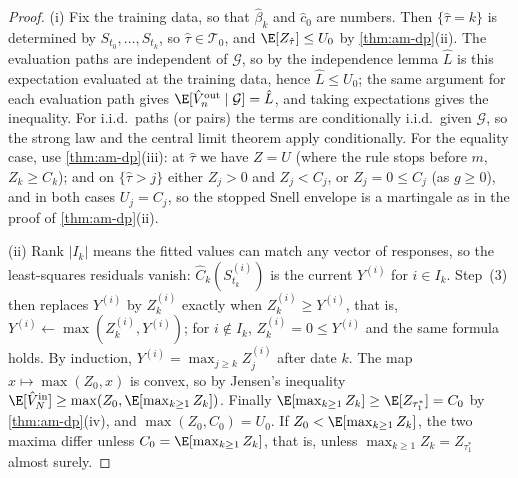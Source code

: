 \begin{proof}
(i) Fix the training data, so that $\hat\beta_k$ and $\hat c_0$ are numbers. Then
$\{\hat\tau=k\}$ is determined by $S_{t_0},\dots,S_{t_k}$, so $\hat\tau\in\mathcal T_0$, and
$\E[Z_{\hat\tau}]\le U_0$ by \cref{thm:am-dp}(ii). The evaluation paths are independent of
$\mathcal G$, so by the independence lemma $\hat L$ is this expectation evaluated at the
training data, hence $\hat L\le U_0$; the same argument for each evaluation path gives
$\E[\hat V^{\rm out}_n\mid\mathcal G]=\hat L$, and taking expectations gives the inequality.
For i.i.d.\ paths (or pairs) the terms are conditionally i.i.d.\ given $\mathcal G$, so the
strong law and the central limit theorem apply conditionally. For the equality case, use \cref{thm:am-dp}(iii): at
$\hat\tau$ we have $Z=U$ (where the rule stops before $m$, $Z_k\ge C_k$); and on
$\{\hat\tau>j\}$ either $Z_j>0$ and $Z_j<C_j$, or $Z_j=0\le C_j$ (as $g\ge0$), and in both
cases $U_j=C_j$, so the stopped Snell envelope is a martingale as in the proof of
\cref{thm:am-dp}(ii).

(ii) Rank $|I_k|$ means the fitted values can match any vector of responses, so the
least-squares residuals vanish: $\hat C_k(S^{(i)}_{t_k})$ is the current $Y^{(i)}$ for
$i\in I_k$. Step~(3) then replaces $Y^{(i)}$ by $Z^{(i)}_k$ exactly when $Z^{(i)}_k\ge Y^{(i)}$,
that is, $Y^{(i)}\leftarrow\max(Z^{(i)}_k,Y^{(i)})$; for $i\notin I_k$, $Z^{(i)}_k=0\le
Y^{(i)}$ and the same formula holds. By induction, $Y^{(i)}=\max_{j\ge k}Z^{(i)}_j$ after
date $k$. The map $x\mapsto\max(Z_0,x)$ is convex, so by Jensen's inequality
$\E[\hat V^{\rm in}_N]\ge\max(Z_0,\E[\max_{k\ge1}Z_k])$. Finally
$\E[\max_{k\ge1}Z_k]\ge\E[Z_{\tau^*_1}]=C_0$ by \cref{thm:am-dp}(iv), and
$\max(Z_0,C_0)=U_0$. If $Z_0<\E[\max_{k\ge1}Z_k]$, the two maxima differ unless
$C_0=\E[\max_{k\ge1}Z_k]$, that is, unless $\max_{k\ge1}Z_k=Z_{\tau^*_1}$ almost surely.
\end{proof}

